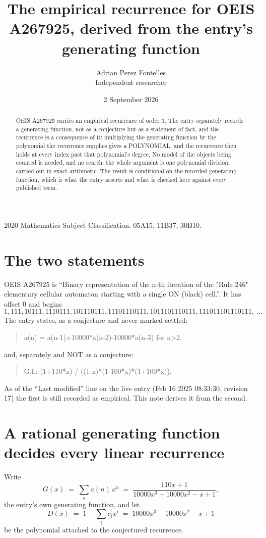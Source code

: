 \documentclass[11pt,a4paper]{article}
\title{The empirical recurrence for OEIS A267925, derived from the entry's generating function}
\author{Adrian Perez Fontelles\\ \small Independent researcher}
\date{2 September 2026}
\theoremstyle{plain}
\theoremstyle{definition}
\begin{document}
\maketitle

\begin{abstract}
OEIS A267925 carries an empirical recurrence of order $3$. The entry separately records a
generating function, not as a conjecture but as a statement of fact, and the recurrence is a
consequence of it: multiplying the generating function by the polynomial the recurrence
supplies gives a POLYNOMIAL, and the recurrence then holds at every index past that
polynomial's degree. No model of the objects being counted is needed, and no search: the
whole argument is one polynomial division, carried out in exact arithmetic. The result is
conditional on the recorded generating function, which is what the entry asserts and what is
checked here against every published term.
\end{abstract}

\noindent\small 2020 Mathematics Subject Classification. 05A15, 11B37, 30B10.\normalsize

\section{The two statements}

OEIS A267925 is ``Binary representation of the n-th iteration of the "Rule 246" elementary cellular automaton starting with a single ON (black) cell.''. It has offset $0$ and begins
\[
1, 111, 10111, 1110111, 101110111, 11101110111, 1011101110111, 111011101110111,\ \dots
\]
The entry states, as a conjecture and never marked settled:
\begin{quote}
a(n) = a(n-1)+10000*a(n-2)-10000*a(n-3) for n>2.
\end{quote}
and, separately and NOT as a conjecture:
\begin{quote}
G.f.: (1+110*x) / ((1-x)*(1-100*x)*(1+100*x)).
\end{quote}
As of the ``Last modified'' line on the live entry (Feb 16 2025 08:33:30, revision 17) the first is still
recorded as empirical. This note derives it from the second.

\section{A rational generating function decides every linear recurrence}

Write
\[
G(x)\;=\;\sum_{n}a(n)\,x^{n}\;=\;\frac{110 x + 1}{10000 x^{3} - 10000 x^{2} - x + 1},
\]
the entry's own generating function, and let
\[
D(x)\;=\;1-\sum_i c_i x^{i}\;=\;10000 x^{3} - 10000 x^{2} - x + 1
\]
be the polynomial attached to the conjectured recurrence.
\end{document}
